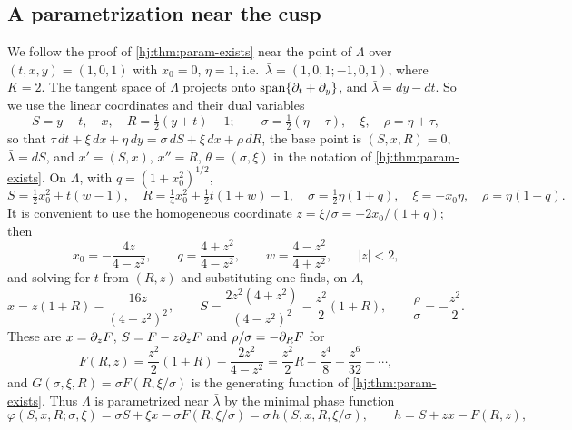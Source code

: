 \subsection{A parametrization near the cusp}
We follow the proof of \cref{hj:thm:param-exists} near the point of $\Lambda$
over $(t,x,y)=(1,0,1)$ with $x_0=0$, $\eta=1$, i.e.\ $\bar\lambda=(1,0,1;-1,0,1)$,
where $K=2$.  The tangent space of $\Lambda$ projects onto
$\operatorname{span}\{\partial_t+\partial_y\}$, and $\bar\lambda=dy-dt$.  So we use the
linear coordinates and their dual variables
\begin{equation*}
  S=y-t,\quad x,\quad R=\tfrac12(y+t)-1;\qquad \sigma=\tfrac12(\eta-\tau),\quad
  \xi,\quad\rho=\eta+\tau,
\end{equation*}
so that $\tau\,dt+\xi\,dx+\eta\,dy=\sigma\,dS+\xi\,dx+\rho\,dR$, the base point is
$(S,x,R)=0$, $\bar\lambda=dS$, and $x'=(S,x)$, $x''=R$, $\theta=(\sigma,\xi)$ in
the notation of \cref{hj:thm:param-exists}.  On $\Lambda$, with $q=(1+x_0^2)^{1/2}$,
\begin{equation*}
  S=\tfrac12x_0^2+t(w-1),\quad R=\tfrac14x_0^2+\tfrac12t(1+w)-1,\quad
  \sigma=\tfrac12\eta(1+q),\quad\xi=-x_0\eta,\quad\rho=\eta(1-q).
\end{equation*}
It is convenient to use the homogeneous coordinate $z=\xi/\sigma=-2x_0/(1+q)$;
then
\begin{equation*}
  x_0=-\frac{4z}{4-z^2},\qquad q=\frac{4+z^2}{4-z^2},\qquad w=\frac{4-z^2}{4+z^2},
  \qquad |z|<2,
\end{equation*}
and solving for $t$ from $(R,z)$ and substituting one finds, on $\Lambda$,
\begin{equation*}
  x=z(1+R)-\frac{16z}{(4-z^2)^2},\qquad S=\frac{2z^2(4+z^2)}{(4-z^2)^2}-
  \frac{z^2}2(1+R),\qquad \frac\rho\sigma=-\frac{z^2}2 .
\end{equation*}
These are $x=\partial_zF$, $S=F-z\partial_zF$ and $\rho/\sigma=-\partial_RF$ for
\begin{equation*}
  F(R,z)=\frac{z^2}2(1+R)-\frac{2z^2}{4-z^2}=\frac{z^2}2R-\frac{z^4}8-
  \frac{z^6}{32}-\cdots,
\end{equation*}
and $G(\sigma,\xi,R)=\sigma F(R,\xi/\sigma)$ is the generating function of
\cref{hj:thm:param-exists}.  Thus $\Lambda$ is parametrized near $\bar\lambda$
by the minimal phase function
\begin{equation}\label{hj:eq:keller-phase}
  \varphi(S,x,R;\sigma,\xi)=\sigma S+\xi x-\sigma F(R,\xi/\sigma)=\sigma\,
  h(S,x,R,\xi/\sigma),\qquad h=S+zx-F(R,z),
\end{equation}
